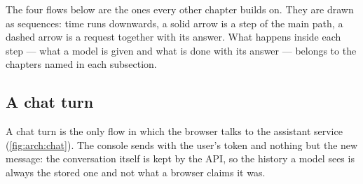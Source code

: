 The four flows below are the ones every other chapter builds on. They are drawn as sequences:
time runs downwards, a solid arrow is a step of the main path, a dashed arrow is a request
together with its answer. What happens inside each step --- what a model is given and what is
done with its answer --- belongs to the chapters named in each subsection.

\subsection{A chat turn}

A chat turn is the only flow in which the browser talks to the assistant service
(\cref{fig:arch:chat}). The console sends  with the user's
token and nothing but the new message: the conversation itself is kept by the API, so the
history a model sees is always the stored one and not what a browser claims it was.

